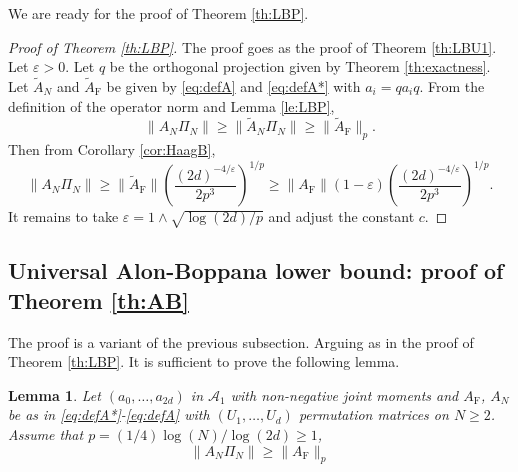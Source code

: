 \documentclass[11pt]{article}
\renewcommand{\star}{{\mathrm{F}}}
\newtheorem{lemma}{Lemma}[section]
\newcommand{\cA}{\mathcal{A}}
\newcommand{\PAR}[1]{{{\left(#1\right)}}} %
\newcommand{\1}{1\!\!{\sf I}}
\newcommand{\veps}{\varepsilon}
\begin{document}
We are ready for the proof of Theorem \ref{th:LBP}. 
\begin{proof}[Proof of Theorem \ref{th:LBP}]
The proof goes as the proof of Theorem \ref{th:LBU1}. Let $\veps > 0$. Let $q$ be the orthogonal projection given by Theorem \ref{th:exactness}.
Let $\tilde A_N$ and $\tilde A_\star$ be given by \eqref{eq:defA} and \eqref{eq:defA*} with $a_i = q a_i q$. From the definition of the operator norm and Lemma \ref{le:LBP},
$$
\| A_N \Pi_N \| \geq \| \tilde A_N \Pi_N \| \geq \| \tilde A_\star \|_p .
$$
Then from Corollary \ref{cor:HaagB}, 
$$
 \| A_N \Pi_N \| \geq  \| \tilde A_\star \|  \PAR{ \frac{(2d)^{-4 /   \veps}}{2 p^3}}^{1/p} \geq\|  A_\star \|  ( 1 - \veps) \PAR{ \frac{(2d)^{-4/ \veps}}{2 p^{3}}}^{1/p}.
$$
It remains to take $\veps =1 \wedge  \sqrt {\log (2 d) / p }$ and adjust the constant $c$. \end{proof}

\subsection{Universal Alon-Boppana lower bound: proof of Theorem \ref{th:AB}}

The proof is a variant of the previous subsection. Arguing as in the proof of Theorem \ref{th:LBP}. It is sufficient to prove the following lemma. 

\begin{lemma}\label{le:AB}
Let $(a_0,\ldots,a_{2d})$ in  $\cA_1$ with non-negative joint moments and $A_\star$, $A_N$ be as in \eqref{eq:defA*}-\eqref{eq:defA} with  $(U_1,\ldots, U_d)$ permutation matrices on $N \geq 2$. Assume that $p =   (1/4) \log (N)/ \log (2d) \geq 1$, 
$$
\| A_N \Pi_N \| \geq \| A_\star \|_{p}
$$
\end{lemma}
\end{document}
